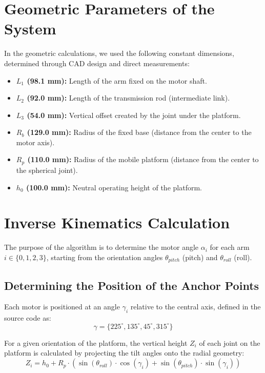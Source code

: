 \documentclass[12pt,a4paper]{report}
\begin{document}
\section{Geometric Parameters of the System}
\label{sec:geom_params}
In the geometric calculations, we used the following constant dimensions, determined through CAD design and direct measurements:
\begin{itemize}[leftmargin=1.5cm]
    \item \textbf{$L_1$ (98.1 mm):} Length of the arm fixed on the motor shaft.
    \item \textbf{$L_2$ (92.0 mm):} Length of the transmission rod (intermediate link).
    \item \textbf{$L_3$ (54.0 mm):} Vertical offset created by the joint under the platform.
    \item \textbf{$R_b$ (129.0 mm):} Radius of the fixed base (distance from the center to the motor axis).
    \item \textbf{$R_p$ (110.0 mm):} Radius of the mobile platform (distance from the center to the spherical joint).
    \item \textbf{$h_0$ (100.0 mm):} Neutral operating height of the platform.
\end{itemize}

\section{Inverse Kinematics Calculation}
The purpose of the algorithm is to determine the motor angle $\alpha_i$ for each arm $i \in \{0, 1, 2, 3\}$, starting from the orientation angles $\theta_{pitch}$ (pitch) and $\theta_{roll}$ (roll).

\subsection{Determining the Position of the Anchor Points}
Each motor is positioned at an angle $\gamma_i$ relative to the central axis, defined in the source code as:
\begin{equation}
    \gamma = \{225^\circ, 135^\circ, 45^\circ, 315^\circ\}
\end{equation}

For a given orientation of the platform, the vertical height $Z_i$ of each joint on the platform is calculated by projecting the tilt angles onto the radial geometry:
\begin{equation}
    Z_i = h_0 + R_p \cdot (\sin(\theta_{roll}) \cdot \cos(\gamma_i) + \sin(\theta_{pitch}) \cdot \sin(\gamma_i))
\end{equation}
\end{document}
